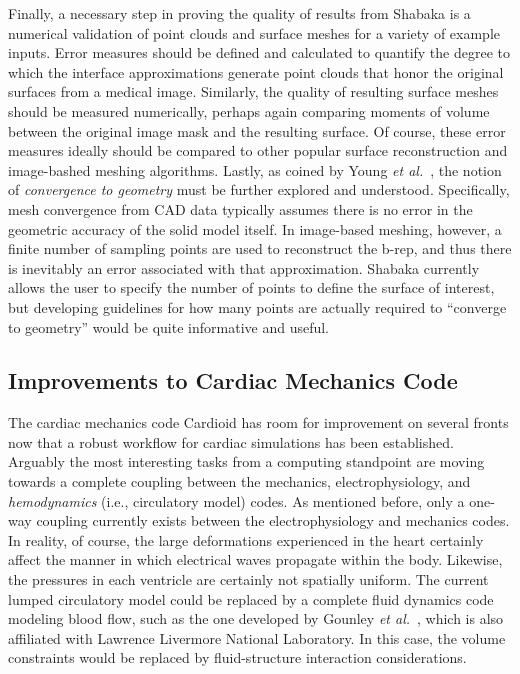 Finally, a necessary step in proving the quality of results from Shabaka is a numerical validation of point clouds and surface meshes for a variety of example inputs. Error measures should be defined and calculated to quantify the degree to which the interface approximations generate point clouds that honor the original surfaces from a medical image. Similarly, the quality of resulting surface meshes should be measured numerically, perhaps again comparing moments of volume between the original image mask and the resulting surface. Of course, these error measures ideally should be compared to other popular surface reconstruction and image-bashed meshing algorithms. Lastly, as coined by Young \textit{et al.}~\cite{young_2008}, the notion of \textit{convergence to geometry} must be further explored and understood. Specifically, mesh convergence from CAD data typically assumes there is no error in the geometric accuracy of the solid model itself. In image-based meshing, however, a finite number of sampling points are used to reconstruct the b-rep, and thus there is inevitably an error associated with that approximation. Shabaka currently allows the user to specify the number of points to define the surface of interest, but developing guidelines for how many points are actually required to ``converge to geometry'' would be quite informative and useful.

\subsection{Improvements to Cardiac Mechanics Code}
\label{Improvements to Cardiac Mechanics Code}

The cardiac mechanics code Cardioid has room for improvement on several fronts now that a robust workflow for cardiac simulations has been established. Arguably the most interesting tasks from a computing standpoint are moving towards a complete coupling between the mechanics, electrophysiology, and \textit{hemodynamics} (i.e., circulatory model) codes. As mentioned before, only a one-way coupling currently exists between the electrophysiology and mechanics codes. In reality, of course, the large deformations experienced in the heart certainly affect the manner in which electrical waves propagate within the body. Likewise, the pressures in each ventricle are certainly not spatially uniform. The current lumped circulatory model could be replaced by a complete fluid dynamics code modeling blood flow, such as the one developed by Gounley \textit{et al.}~\cite{gounley_2017}, which is also affiliated with Lawrence Livermore National Laboratory. In this case, the volume constraints would be replaced by fluid-structure interaction considerations.

